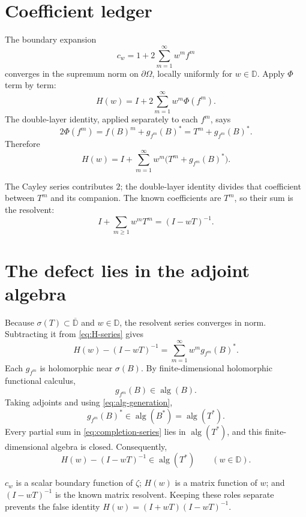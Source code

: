 \documentclass[11pt,oneside,openany]{book}
\theoremstyle{definition}
\theoremstyle{remark}
\newcommand{\D}{\mathbb D}
\newcommand{\alg}{\operatorname{alg}}
\newcommand{\spec}{\sigma}
\newcommand{\olD}{\overline{\D}}
\begin{document}
\section{Coefficient ledger}

The boundary expansion
\[
  c_w=1+2\sum_{m=1}^{\infty}w^mf^m
\]
converges in the supremum norm on \(\partial\Omega\), locally uniformly
for \(w\in\D\).  Apply \(\Phi\) term by term:
\[
  H(w)=I+2\sum_{m=1}^{\infty}w^m\Phi(f^m).
\]
The double-layer identity, applied separately to each \(f^m\), says
\[
  2\Phi(f^m)=f(B)^m+g_{f^m}(B)^*
  =T^m+g_{f^m}(B)^*.
\]
Therefore
\begin{equation}
  H(w)=I+\sum_{m=1}^{\infty}w^m
  \bigl(T^m+g_{f^m}(B)^*\bigr).
  \label{eq:H-series}
\end{equation}

\begin{checkpoint}
The Cayley series contributes \(2\); the double-layer identity divides
that coefficient between \(T^m\) and its companion.  The known
coefficients are \(T^m\), so their sum is the resolvent:
\[
  I+\sum_{m\geq1}w^mT^m=(I-wT)^{-1}.
\]
\end{checkpoint}

\section{The defect lies in the adjoint algebra}

Because \(\spec(T)\subset\olD\) and \(w\in\D\), the resolvent series
converges in norm.  Subtracting it from \eqref{eq:H-series} gives
\begin{equation}
  H(w)-(I-wT)^{-1}
  =\sum_{m=1}^{\infty}w^m g_{f^m}(B)^*.
  \label{eq:completion-series}
\end{equation}
Each \(g_{f^m}\) is holomorphic near \(\spec(B)\).  By finite-dimensional
holomorphic functional calculus,
\[
  g_{f^m}(B)\in\alg(B).
\]
Taking adjoints and using \eqref{eq:alg-generation},
\[
  g_{f^m}(B)^*
  \in\alg(B^*)=\alg(T^*).
\]
Every partial sum in \eqref{eq:completion-series} lies in
\(\alg(T^*)\), and this finite-dimensional algebra is closed.
Consequently,
\begin{equation}
  H(w)-(I-wT)^{-1}\in\alg(T^*)
  \qquad(w\in\D).
  \label{eq:completion-membership}
\end{equation}

\begin{pitfall}
\(c_w\) is a scalar boundary function of \(\zeta\);
\(H(w)\) is a matrix function of \(w\); and
\((I-wT)^{-1}\) is the known matrix resolvent.  Keeping these roles
separate prevents the false identity
\(H(w)=(I+wT)(I-wT)^{-1}\).
\end{pitfall}
\end{document}
